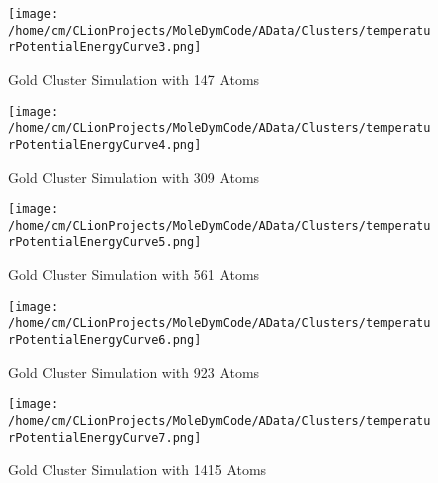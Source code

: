 \begin{figure}[!h] 
    \begin{center} 
        \texttt{[image: /home/cm/CLionProjects/MoleDymCode/AData/Clusters/temperaturPotentialEnergyCurve3.png]} 
    \end{center} 
    \caption[Gold Cluster Simulation with 147 Atoms]{Gold Cluster Simulation with 147 Atoms} 
    \label{GoldClusterSimulationTemperaturEnergy147} 
\end{figure} 
 
\begin{figure}[!h] 
    \begin{center} 
        \texttt{[image: /home/cm/CLionProjects/MoleDymCode/AData/Clusters/temperaturPotentialEnergyCurve4.png]} 
    \end{center} 
    \caption[Gold Cluster Simulation with 309 Atoms]{Gold Cluster Simulation with 309 Atoms} 
    \label{GoldClusterSimulationTemperaturEnergy309} 
\end{figure} 
 
\begin{figure}[!h] 
    \begin{center} 
        \texttt{[image: /home/cm/CLionProjects/MoleDymCode/AData/Clusters/temperaturPotentialEnergyCurve5.png]} 
    \end{center} 
    \caption[Gold Cluster Simulation with 561 Atoms]{Gold Cluster Simulation with 561 Atoms} 
    \label{GoldClusterSimulationTemperaturEnergy561} 
\end{figure} 
 
\begin{figure}[!h] 
    \begin{center} 
        \texttt{[image: /home/cm/CLionProjects/MoleDymCode/AData/Clusters/temperaturPotentialEnergyCurve6.png]} 
    \end{center} 
    \caption[Gold Cluster Simulation with 923 Atoms]{Gold Cluster Simulation with 923 Atoms} 
    \label{GoldClusterSimulationTemperaturEnergy923} 
\end{figure} 
 
\begin{figure}[!h] 
    \begin{center} 
        \texttt{[image: /home/cm/CLionProjects/MoleDymCode/AData/Clusters/temperaturPotentialEnergyCurve7.png]} 
    \end{center} 
    \caption[Gold Cluster Simulation with 1415 Atoms]{Gold Cluster Simulation with 1415 Atoms} 
    \label{GoldClusterSimulationTemperaturEnergy1415} 
\end{figure} 
 
